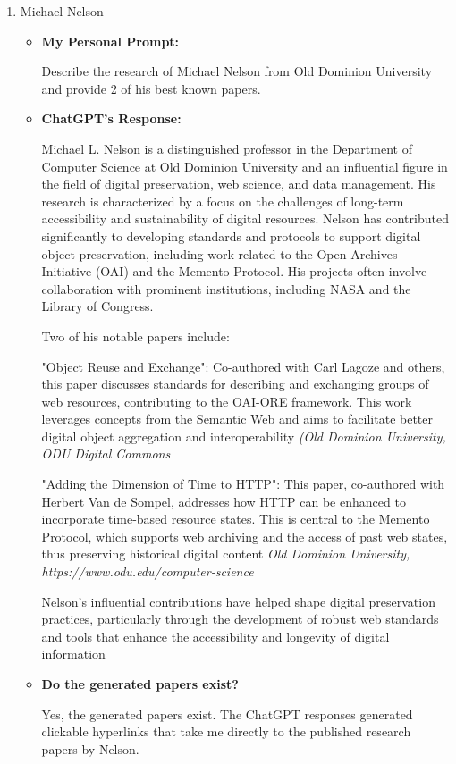 \documentclass[12pt]{article}
\begin{document}
\begin{enumerate}
\begin{itemize}
    \end{itemize}

    \item Michael Nelson
    \begin{itemize}
        \item \textbf{My Personal Prompt:}

        Describe the research of Michael Nelson from Old Dominion University and provide 2 of his best known papers.
        
        \item \textbf{ChatGPT's Response:}

        Michael L. Nelson is a distinguished professor in the Department of Computer Science at Old Dominion University and an influential figure in the field of digital preservation, web science, and data management. His research is characterized by a focus on the challenges of long-term accessibility and sustainability of digital resources. Nelson has contributed significantly to developing standards and protocols to support digital object preservation, including work related to the Open Archives Initiative (OAI) and the Memento Protocol. His projects often involve collaboration with prominent institutions, including NASA and the Library of Congress.

        Two of his notable papers include:
        
        "Object Reuse and Exchange": Co-authored with Carl Lagoze and others, this paper discusses standards for describing and exchanging groups of web resources, contributing to the OAI-ORE framework. This work leverages concepts from the Semantic Web and aims to facilitate better digital object aggregation and interoperability \emph{(Old Dominion University, ODU Digital Commons}
        
        "Adding the Dimension of Time to HTTP": This paper, co-authored with Herbert Van de Sompel, addresses how HTTP can be enhanced to incorporate time-based resource states. This is central to the Memento Protocol, which supports web archiving and the access of past web states, thus preserving historical digital content \emph{Old Dominion University, https://www.odu.edu/computer-science}
        
        Nelson's influential contributions have helped shape digital preservation practices, particularly through the development of robust web standards and tools that enhance the accessibility and longevity of digital information​
                
        \item \textbf{Do the generated papers exist?}

        Yes, the generated papers exist. The ChatGPT responses generated clickable hyperlinks that take me directly to the published research papers by Nelson.

        
    \end{itemize}
\end{enumerate}
\end{document}
